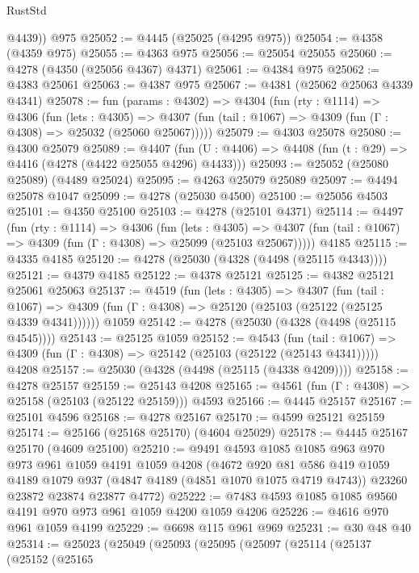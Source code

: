 \begin{lexlean}{RustStd}
\begin{coremodule}
{\begin{coremodule}
{{{{{{{{{{{{{{{{{{{{{{{{{{{{{{{{{{{        @4439))
    @975
@25052 := @4445 (@25025 (@4295 @975))
@25054 := @4358 (@4359 @975)
@25055 := @4363 @975
@25056 := @25054 @25055
@25060 := @4278 (@4350 (@25056 @4367) @4371)
@25061 := @4384 @975
@25062 := @4383 @25061
@25063 := @4387 @975
@25067 := @4381 (@25062 @25063 @4339 @4341)
@25078 := fun (params : @4302) =>
  @4304
    (fun (rty : @1114) =>
    @4306
      (fun (lets : @4305) =>
      @4307 (fun (tail : @1067) => @4309 (fun (Γ : @4308) => @25032 (@25060 @25067)))))
@25079 := @4303 @25078
@25080 := @4300 @25079
@25089 := @4407
    (fun (U : @4406) => @4408 (fun (t : @29) => @4416 (@4278 (@4422 @25055 @4296) @4433)))
@25093 := @25052 (@25080 @25089) (@4489 @25024)
@25095 := @4263 @25079 @25089
@25097 := @4494 @25078 @1047
@25099 := @4278 (@25030 @4500)
@25100 := @25056 @4503
@25101 := @4350 @25100
@25103 := @4278 (@25101 @4371)
@25114 := @4497
    (fun (rty : @1114) =>
    @4306
      (fun (lets : @4305) =>
      @4307 (fun (tail : @1067) => @4309 (fun (Γ : @4308) => @25099 (@25103 @25067)))))
    @4185
@25115 := @4335 @4185
@25120 := @4278 (@25030 (@4328 (@4498 (@25115 @4343))))
@25121 := @4379 @4185
@25122 := @4378 @25121
@25125 := @4382 @25121 @25061 @25063
@25137 := @4519
    (fun (lets : @4305) =>
    @4307
      (fun (tail : @1067) =>
      @4309 (fun (Γ : @4308) => @25120 (@25103 (@25122 (@25125 @4339 @4341))))))
    @1059
@25142 := @4278 (@25030 (@4328 (@4498 (@25115 @4545))))
@25143 := @25125 @1059
@25152 := @4543
    (fun (tail : @1067) => @4309 (fun (Γ : @4308) => @25142 (@25103 (@25122 (@25143 @4341)))))
    @4208
@25157 := @25030 (@4328 (@4498 (@25115 (@4338 @4209))))
@25158 := @4278 @25157
@25159 := @25143 @4208
@25165 := @4561 (fun (Γ : @4308) => @25158 (@25103 (@25122 @25159))) @4593
@25166 := @4445 @25157
@25167 := @25101 @4596
@25168 := @4278 @25167
@25170 := @4599 @25121 @25159
@25174 := @25166 (@25168 @25170) (@4604 @25029)
@25178 := @4445 @25167 @25170 (@4609 @25100)
@25210 := @9491
    @4593
    @1085
    @1085
    @963
    @970
    @973
    @961
    @1059
    @4191
    @1059
    @4208
    (@4672
      @920
      @81
      @586
      @419
      @1059
      @4189
      @1079
      @937
      (@4847 @4189 (@4851 @1070 @1075 @4719 @4743))
      @23260
      @23872
      @23874
      @23877
      @4772)
@25222 := @7483 @4593 @1085 @1085 @9560 @4191 @970 @973 @961 @1059 @4200 @1059 @4206
@25226 := @4616 @970 @961 @1059 @4199
@25229 := @6698 @115 @961 @969
@25231 := @30 @48 @40
@25314 := @25023
    (@25049
      (@25093
        (@25095
          (@25097
            (@25114
              (@25137
                (@25152
                  (@25165
}}}}}}}}}}}}}}}}}}}}}}}}}}}}}}}}}}}
\end{coremodule}}
\end{coremodule}
\end{lexlean}
